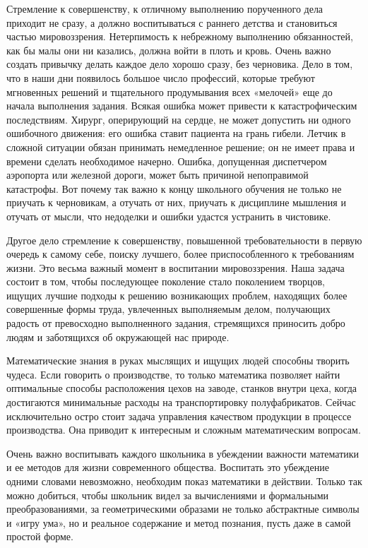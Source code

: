 \documentclass[12pt, a4paper, openany]{book}
\begin{document}
Стремление к совершенству, к отличному выполнению порученного дела приходит не сразу, а должно  воспитываться с раннего детства и становиться частью  мировоззрения. Нетерпимость к небрежному выполнению  обязанностей, как бы малы они ни казались, должна войти в плоть и кровь. Очень важно создать привычку делать каждое дело хорошо сразу, без черновика. Дело в том, что в наши дни появилось большое число профессий, которые требуют мгновенных решений и тщательного продумывания всех «мелочей» еще до начала выполнения задания. Всякая ошибка может привести к катастрофическим последствиям. Хирург, оперирующий на сердце, не может допустить ни одного ошибочного движения: его ошибка ставит пациента на грань гибели. Летчик в сложной ситуации обязан  принимать немедленное решение; он не имеет права и времени сделать необходимое начерно. Ошибка, допущенная  диспетчером аэропорта или железной дороги, может быть  причиной непоправимой катастрофы. Вот почему так важно к концу школьного обучения не только не приучать к  черновикам, а отучать от них, приучать к дисциплине  мышления и отучать от мысли, что недоделки и ошибки удастся устранить в чистовике. 

Другое дело стремление к совершенству, повышенной требовательности в первую очередь к самому себе, поиску лучшего, более приспособленного к требованиям жизни. Это весьма важный момент в воспитании мировоззрения. Наша задача состоит в том, чтобы последующее поколение стало поколением творцов, ищущих лучшие подходы к  решению возникающих проблем, находящих более  совершенные формы труда, увлеченных выполняемым делом,  получающих радость от превосходно выполненного задания, стремящихся приносить добро людям и заботящихся об окружающей нас природе. 

Математические знания в руках мыслящих и ищущих людей способны творить чудеса. Если говорить о  производстве, то только математика позволяет найти оптимальные способы расположения цехов на заводе, станков внутри цеха, когда достигаются минимальные расходы на  транспортировку полуфабрикатов. Сейчас исключительно остро стоит задача управления качеством продукции в процессе производства. Она приводит к интересным и сложным математическим вопросам. 

Очень важно воспитывать каждого школьника в  убеждении важности математики и ее методов для жизни  современного общества. Воспитать это убеждение одними словами невозможно, необходим показ математики в действии. Только так можно добиться, чтобы школьник видел за вычислениями и формальными преобразованиями, за  геометрическими образами не только абстрактные символы и «игру ума», но и реальное содержание и метод познания, пусть даже в самой простой форме. 
\end{document}
